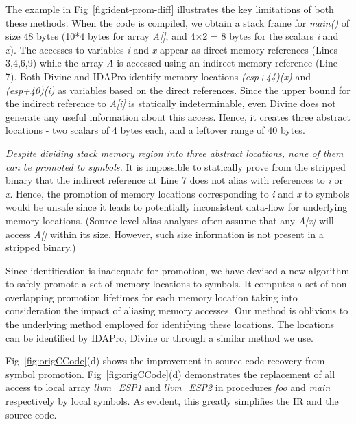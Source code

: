 The example in Fig~\ref{fig:ident-prom-diff} illustrates the key limitations of both these methods. When the code is compiled, we obtain a stack frame for \emph{main()} of size 48 bytes (10*4 bytes for array \emph{A[]}, and 4$\times$2 = 8 bytes for the scalars \emph{i} and \emph{x}). The accesses to variables \emph{i} and \emph{x} appear as direct memory references (Lines 3,4,6,9) while the array \emph{A} is accessed using an indirect memory reference (Line 7). Both Divine and IDAPro identify memory locations \emph{(esp+44)(x)} and \emph{(esp+40)(i)} as variables based on the direct references. Since the upper bound for the indirect reference to \emph{A[i]} is statically indeterminable, even Divine does not generate any useful information about this access. Hence, it creates three abstract locations - two scalars of 4 bytes each, and a leftover range of 40 bytes.

\emph{Despite dividing stack memory region into three abstract locations, none of them can be promoted to symbols.} It is impossible to statically prove from the stripped binary that the indirect reference at Line 7 does not alias with references to \emph{i} or \emph{x}. Hence, the promotion of memory locations corresponding to \emph{i} and \emph{x} to symbols would be unsafe since it leads to potentially inconsistent data-flow for underlying memory locations. (Source-level alias analyses often assume that any \emph{A[x]} will access \emph{A[]} within its size. However, such size information is not present in a stripped binary.)

Since identification is inadequate for promotion, we have devised a new algorithm to safely promote a set of memory locations to symbols. It computes a set of non-overlapping promotion lifetimes for each memory location taking into consideration the impact of aliasing memory accesses. Our method is oblivious to the underlying method employed for identifying these locations. The locations can be identified by IDAPro, Divine or through a similar method we use.

Fig~\ref{fig:origCCode}(d) shows the improvement in source code recovery from symbol promotion. Fig~\ref{fig:origCCode}(d) demonstrates the replacement of all access to local array \emph{llvm\_ESP1} and \emph{llvm\_ESP2} in procedures \emph{foo} and \emph{main} respectively by local symbols. As evident, this greatly simplifies the IR and the source code.

